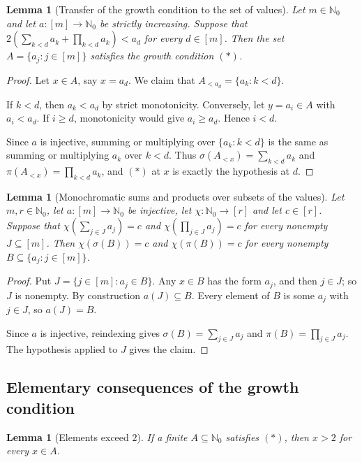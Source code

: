 \documentclass[11pt]{article}
\newtheorem{lemma}[theorem]{Lemma}
\theoremstyle{definition}
\theoremstyle{remark}
\newcommand{\Nz}{\mathbb{N}_0}
\begin{document}
\begin{lemma}[Transfer of the growth condition to the set of values]\label{lem:hfs_growth_image}
Let $m\in\Nz$ and let $a:[m]\to\Nz$ be strictly increasing. Suppose that $2(\sum_{k<d}a_k+\prod_{k<d}a_k)<a_d$ for every $d\in[m]$. Then the set $A=\{a_j:j\in[m]\}$ satisfies the growth condition $(\ast)$.
\end{lemma}

\begin{proof}
Let $x\in A$, say $x=a_d$. We claim that $A_{<a_d}=\{a_k:k<d\}$.

If $k<d$, then $a_k<a_d$ by strict monotonicity. Conversely, let $y=a_i\in A$ with $a_i<a_d$. If $i\ge d$, monotonicity would give $a_i\ge a_d$. Hence $i<d$.

Since $a$ is injective, summing or multiplying over $\{a_k:k<d\}$ is the same as summing or multiplying $a_k$ over $k<d$. Thus $\sigma(A_{<x})=\sum_{k<d}a_k$ and $\pi(A_{<x})=\prod_{k<d}a_k$, and $(\ast)$ at $x$ is exactly the hypothesis at $d$.
\end{proof}

\begin{lemma}[Monochromatic sums and products over subsets of the values]\label{lem:hfs_mono_image}
Let $m,r\in\Nz$, let $a:[m]\to\Nz$ be injective, let $\chi:\Nz\to[r]$ and let $c\in[r]$. Suppose that $\chi(\sum_{j\in J}a_j)=c$ and $\chi(\prod_{j\in J}a_j)=c$ for every nonempty $J\subseteq[m]$. Then $\chi(\sigma(B))=c$ and $\chi(\pi(B))=c$ for every nonempty $B\subseteq\{a_j:j\in[m]\}$.
\end{lemma}

\begin{proof}
Put $J=\{j\in[m]:a_j\in B\}$. Any $x\in B$ has the form $a_j$, and then $j\in J$; so $J$ is nonempty. By construction $a(J)\subseteq B$. Every element of $B$ is some $a_j$ with $j\in J$, so $a(J)=B$.

Since $a$ is injective, reindexing gives $\sigma(B)=\sum_{j\in J}a_j$ and $\pi(B)=\prod_{j\in J}a_j$. The hypothesis applied to $J$ gives the claim.
\end{proof}

\subsection{Elementary consequences of the growth condition}

\begin{lemma}[Elements exceed $2$]\label{lem:hfs_gt_two}
If a finite $A\subseteq\Nz$ satisfies $(\ast)$, then $x>2$ for every $x\in A$.
\end{lemma}
\end{document}
